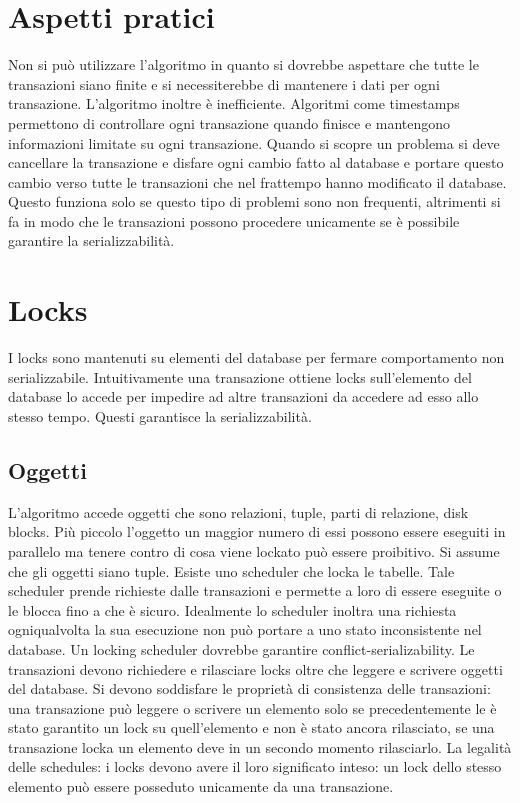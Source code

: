 \section{Aspetti pratici}
Non si pu\`o utilizzare l'algoritmo in quanto si dovrebbe aspettare che tutte le transazioni siano finite e si necessiterebbe di mantenere i dati per ogni transazione. L'algoritmo inoltre \`e inefficiente. Algoritmi
come timestamps permettono di controllare ogni transazione quando finisce e mantengono informazioni limitate su ogni transazione. Quando si scopre un problema si deve cancellare la transazione e disfare
ogni cambio fatto al database e portare questo cambio verso tutte le transazioni che nel frattempo hanno modificato il database. Questo funziona solo se questo tipo di problemi sono non frequenti, altrimenti
si fa in modo che le transazioni possono procedere unicamente se \`e possibile garantire la serializzabilit\`a. 
\section{Locks}
I locks sono mantenuti su elementi del database per fermare comportamento non serializzabile. Intuitivamente una transazione ottiene locks sull'elemento del database lo accede per impedire ad altre 
transazioni da accedere ad esso allo stesso tempo. Questi garantisce la serializzabilit\`a. 
\subsection{Oggetti}
L'algoritmo accede oggetti che sono relazioni, tuple, parti di relazione, disk blocks. Pi\`u piccolo l'oggetto un maggior numero di essi possono essere eseguiti in parallelo ma tenere contro di cosa viene lockato
pu\`o essere proibitivo. Si assume che gli oggetti siano tuple. Esiste uno scheduler che locka le tabelle. Tale scheduler prende richieste dalle transazioni e permette a loro di essere eseguite o le blocca fino a che
\`e sicuro. Idealmente lo scheduler inoltra una richiesta ogniqualvolta la sua esecuzione non pu\`o portare a uno stato inconsistente nel database. Un locking scheduler dovrebbe garantire conflict-serializability.
Le transazioni devono richiedere e rilasciare locks oltre che leggere e scrivere oggetti del database. Si devono soddisfare le propriet\`a di consistenza delle transazioni: una transazione pu\`o leggere o scrivere 
un elemento solo se precedentemente le \`e stato garantito un lock su quell'elemento e non \`e stato ancora rilasciato, se una transazione locka un elemento deve in un secondo momento rilasciarlo. La 
legalit\`a delle schedules: i locks devono avere il loro significato inteso: un lock dello stesso elemento pu\`o essere posseduto unicamente da una transazione. 
